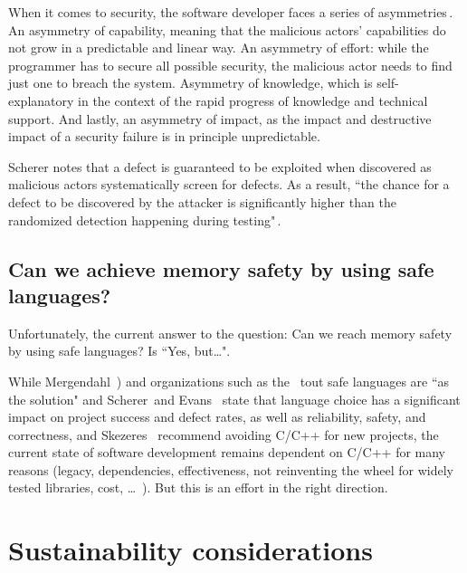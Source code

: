 \documentclass[nomenclature, english, bibtex]{kththesis}
\begin{document}
When it comes to security, the software developer faces a series of asymmetries\,\cite{chapman_adacore_2018}. An asymmetry of capability, meaning that the malicious actors' capabilities do not grow in a predictable and linear way. An asymmetry of effort: while the programmer has to secure all possible security, the malicious actor needs to find just one to breach the system. Asymmetry of knowledge, which is self-explanatory in the context of the rapid progress of knowledge and technical support. And lastly, an asymmetry of impact, as the impact and destructive impact of a security failure is in principle unpredictable. 

Scherer notes that a defect is guaranteed to be exploited when discovered as malicious actors systematically screen for defects. As a result, ``the chance for a defect to be discovered by the attacker is significantly higher than the randomized detection happening during testing"\,\cite{scherer_engineering_2021}.


\subsection{Can we achieve memory safety by using safe languages?}
\label{sec:CanMemorySafety}

Unfortunately, the current answer to the question: Can we reach memory safety by using safe languages? Is ``Yes, but\ldots".

While Mergendahl \etal\,\cite{mergendahl_cross-language_2022}) and organizations such as the \,\cite{noauthor_nsa_2022} tout safe languages are ``as the solution" and Scherer\,\cite{scherer_engineering_2021} and Evans \etal\,\cite{evans_is_2020} state that language choice has a significant impact on project success and defect rates, as well as reliability, safety, and correctness,  and Skezeres \etal\,\cite{szekeres_sok_2013} recommend avoiding C/C++ for new projects, the current state of software development remains dependent on C/C++ for many reasons (legacy, dependencies, effectiveness, not reinventing the wheel for widely tested libraries, cost, \ldots\  ). But this is an effort in the right direction.

\section{Sustainability considerations}
\end{document}
